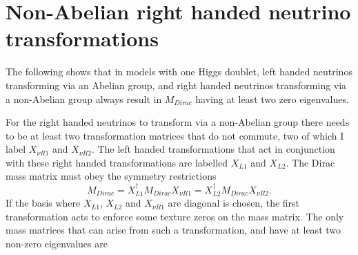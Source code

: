 \documentclass[nofootinbib,showpacs]{revtex4}
\begin{document}
\section{Non-Abelian right handed neutrino transformations}\label{appnonAb}


The following shows that in models with one Higgs doublet, left handed neutrinos transforming via an Abelian group, and right handed neutrinos transforming via a non-Abelian group always result in $M_{Dirac}$ having at least two zero eigenvalues. 

For the right handed neutrinos to transform via a non-Abelian group there needs to be at least two transformation matrices that do not commute, two of which I label $X_{\nu R 1}$ and $X_{\nu R 2}$. The left handed transformations that act in conjunction with these right handed transformations are labelled $X_{L 1}$ and $X_{L 2}$. 
The Dirac mass matrix must obey the symmetry restrictions
\begin{equation}
M_{Dirac}=X_{L 1}^\dagger M_{Dirac} X_{\nu R 1}=X_{L 2}^\dagger M_{Dirac} X_{\nu R 2}.
\end{equation}
If the basis where $X_{L 1}$,  $X_{L 2}$ and $X_{\nu R 1}$ are diagonal is chosen, the first transformation acts to enforce some texture zeros on the mass matrix. The only mass matrices that can arise from such a transformation, and have at least two non-zero eigenvalues are
\end{document}
